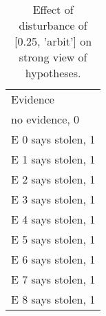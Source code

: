 \begin{table}\begin{tabular}{l}\toprule\multirow{2}{*}{Evidence} \\\\\midrule
no evidence, 0 & \\E 0 says stolen, 1 & \\E 1 says stolen, 1 & \\E 2 says stolen, 1 & \\E 3 says stolen, 1 & \\E 4 says stolen, 1 & \\E 5 says stolen, 1 & \\E 6 says stolen, 1 & \\E 7 says stolen, 1 & \\E 8 says stolen, 1 & \\\bottomrule\end{tabular}\caption{Effect of disturbance of [0.25, 'arbit'] on strong view of hypotheses.}\end{table}